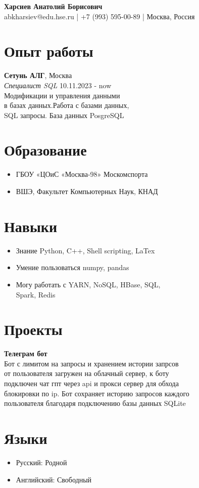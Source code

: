\documentclass[a4paper,12pt]{article}
\begin{document}
\begin{center}
    \Huge\textbf{{Харсиев Анатолий Борисович}}\\
    \normalsize{abkharsiev@edu.hse.ru | +7 (993) 595-00-89 | Москва, Россия}
\end{center}

\section*{Опыт работы}
\large{
\textbf{Сетунь АЛГ}, Москва \\
\emph{Специалист SQL} \hfill 10.11.2023 - now \\
Модификации и управления данными\\
в базах данных.Работа с базами данных,\\
SQL запросы. База данных PosgreSQL}



\section*{Образование}
\begin{itemize}
    \item ГБОУ «ЦОиС «Москва-98» Москомспорта
    \item ВШЭ, Факультет Компьютерных Наук, КНАД
\end{itemize}
 

\section*{Навыки}
\begin{itemize}
    \item Знание Python, C++, Shell scripting, LaTex
    \item Умение пользоваться numpy, pandas
    \item Могу работать с YARN, NoSQL, HBase, SQL,\\
    Spark, Redis
\end{itemize}

\section*{Проекты}
\textbf{Телеграм бот} \\
\large{Бот с лимитом на запросы и хранением истории запрсов\\
от пользователя загружен на облачный сервер, к боту\\
подключен чат гпт через api и прокси сервер для обхода \\
блокировки по ip. Бот сохраняет историю запросов каждого\\
пользователя благодаря подключению базы данных SQLite}

\section*{Языки}
\begin{itemize}
    \item Русский: Родной
    \item Английский: Свободный 
\end{itemize}
\end{document}
